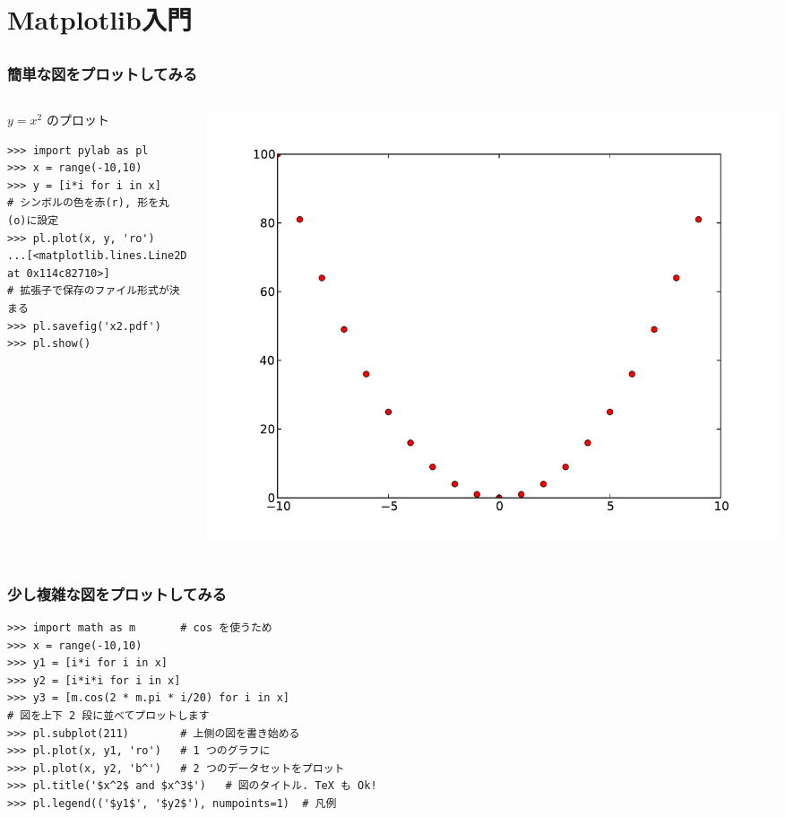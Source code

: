 \section{Matplotlib入門}
\subsection*{\redm\whiteb\greenb}

\begin{frame}[t,fragile]
\frametitle{簡単な図をプロットしてみる}
\begin{columns}
\begin{column}{6cm}
$y = x^2$ のプロット
\begin{lstlisting}
>>> import pylab as pl
>>> x = range(-10,10)
>>> y = [i*i for i in x]
# シンボルの色を赤(r), 形を丸(o)に設定
>>> pl.plot(x, y, 'ro')
...[<matplotlib.lines.Line2D at 0x114c82710>]
# 拡張子で保存のファイル形式が決まる
>>> pl.savefig('x2.pdf') 
>>> pl.show()
\end{lstlisting}
\end{column}

\begin{column}{6cm}
\includegraphics[width=\textwidth]{x2.pdf}
\end{column}
\end{columns}
\end{frame}

\subsection*{\redm\whitem\greenb}

\begin{frame}[t,fragile]
\frametitle{少し複雑な図をプロットしてみる}
\begin{lstlisting}
>>> import math as m       # cos を使うため
>>> x = range(-10,10)
>>> y1 = [i*i for i in x]
>>> y2 = [i*i*i for i in x]
>>> y3 = [m.cos(2 * m.pi * i/20) for i in x]
# 図を上下 2 段に並べてプロットします
>>> pl.subplot(211)        # 上側の図を書き始める
>>> pl.plot(x, y1, 'ro')   # 1 つのグラフに
>>> pl.plot(x, y2, 'b^')   # 2 つのデータセットをプロット
>>> pl.title('$x^2$ and $x^3$')   # 図のタイトル. TeX も Ok!
>>> pl.legend(('$y1$', '$y2$'), numpoints=1)  # 凡例
\end{lstlisting}
\end{frame}

